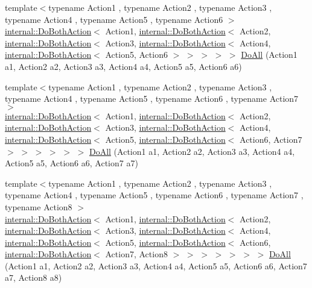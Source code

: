 \begin{DoxyCompactItemize}
\item 
{\footnotesize template$<$typename Action1 , typename Action2 , typename Action3 , typename Action4 , typename Action5 , typename Action6 $>$ }\\\hyperlink{classtesting_1_1internal_1_1_do_both_action}{internal\+::\+Do\+Both\+Action}$<$ Action1, \hyperlink{classtesting_1_1internal_1_1_do_both_action}{internal\+::\+Do\+Both\+Action}$<$ Action2, \hyperlink{classtesting_1_1internal_1_1_do_both_action}{internal\+::\+Do\+Both\+Action}$<$ Action3, \hyperlink{classtesting_1_1internal_1_1_do_both_action}{internal\+::\+Do\+Both\+Action}$<$ Action4, \hyperlink{classtesting_1_1internal_1_1_do_both_action}{internal\+::\+Do\+Both\+Action}$<$ Action5, Action6 $>$ $>$ $>$ $>$ $>$ \hyperlink{namespacetesting_aa6c87c8d7520fb333f1559487d3e06e9}{Do\+All} (Action1 a1, Action2 a2, Action3 a3, Action4 a4, Action5 a5, Action6 a6)
\item 
{\footnotesize template$<$typename Action1 , typename Action2 , typename Action3 , typename Action4 , typename Action5 , typename Action6 , typename Action7 $>$ }\\\hyperlink{classtesting_1_1internal_1_1_do_both_action}{internal\+::\+Do\+Both\+Action}$<$ Action1, \hyperlink{classtesting_1_1internal_1_1_do_both_action}{internal\+::\+Do\+Both\+Action}$<$ Action2, \hyperlink{classtesting_1_1internal_1_1_do_both_action}{internal\+::\+Do\+Both\+Action}$<$ Action3, \hyperlink{classtesting_1_1internal_1_1_do_both_action}{internal\+::\+Do\+Both\+Action}$<$ Action4, \hyperlink{classtesting_1_1internal_1_1_do_both_action}{internal\+::\+Do\+Both\+Action}$<$ Action5, \hyperlink{classtesting_1_1internal_1_1_do_both_action}{internal\+::\+Do\+Both\+Action}$<$ Action6, Action7 $>$ $>$ $>$ $>$ $>$ $>$ \hyperlink{namespacetesting_aadfaf4eb9897dcabe067b1d882febc86}{Do\+All} (Action1 a1, Action2 a2, Action3 a3, Action4 a4, Action5 a5, Action6 a6, Action7 a7)
\item 
{\footnotesize template$<$typename Action1 , typename Action2 , typename Action3 , typename Action4 , typename Action5 , typename Action6 , typename Action7 , typename Action8 $>$ }\\\hyperlink{classtesting_1_1internal_1_1_do_both_action}{internal\+::\+Do\+Both\+Action}$<$ Action1, \hyperlink{classtesting_1_1internal_1_1_do_both_action}{internal\+::\+Do\+Both\+Action}$<$ Action2, \hyperlink{classtesting_1_1internal_1_1_do_both_action}{internal\+::\+Do\+Both\+Action}$<$ Action3, \hyperlink{classtesting_1_1internal_1_1_do_both_action}{internal\+::\+Do\+Both\+Action}$<$ Action4, \hyperlink{classtesting_1_1internal_1_1_do_both_action}{internal\+::\+Do\+Both\+Action}$<$ Action5, \hyperlink{classtesting_1_1internal_1_1_do_both_action}{internal\+::\+Do\+Both\+Action}$<$ Action6, \hyperlink{classtesting_1_1internal_1_1_do_both_action}{internal\+::\+Do\+Both\+Action}$<$ Action7, Action8 $>$ $>$ $>$ $>$ $>$ $>$ $>$ \hyperlink{namespacetesting_a2c0e69056a8e5bc4ddc2308ba0af5214}{Do\+All} (Action1 a1, Action2 a2, Action3 a3, Action4 a4, Action5 a5, Action6 a6, Action7 a7, Action8 a8)

\end{DoxyCompactItemize}
